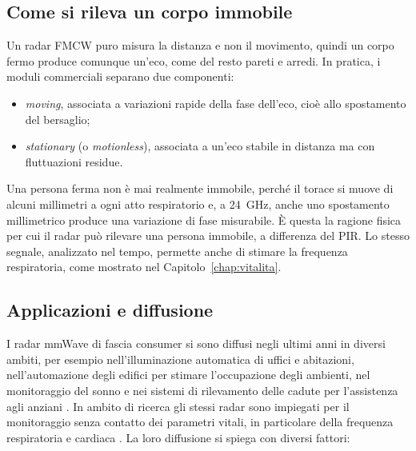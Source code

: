 \FloatBarrier
\subsection{Come si rileva un corpo immobile}
\label{subsec:corpo-immobile}

Un radar FMCW puro misura la distanza e non il movimento, quindi un corpo fermo produce comunque un'eco, come del resto pareti e arredi. In pratica, i moduli commerciali separano due componenti:

\begin{itemize}
    \item \textit{moving}, associata a variazioni rapide della fase dell'eco, cioè allo spostamento del bersaglio;

    \item \textit{stationary} (o \textit{motionless}), associata a un'eco stabile in distanza ma con fluttuazioni residue.
\end{itemize}

Una persona ferma non è mai realmente immobile, perché il torace si muove di alcuni millimetri a ogni atto respiratorio e, a 24~GHz, anche uno spostamento millimetrico produce una variazione di fase misurabile. È questa la ragione fisica per cui il radar può rilevare una persona immobile, a differenza del PIR. Lo stesso segnale, analizzato nel tempo, permette anche di stimare la frequenza respiratoria, come mostrato nel Capitolo~\ref{chap:vitalita}.

\subsection{Applicazioni e diffusione}
\label{subsec:mmwave-usi}

I radar mmWave di fascia consumer si sono diffusi negli ultimi anni in diversi ambiti, per esempio nell'illuminazione automatica di uffici e abitazioni, nell'automazione degli edifici per stimare l'occupazione degli ambienti, nel monitoraggio del sonno e nei sistemi di rilevamento delle cadute per l'assistenza agli anziani \cite{mmwaveOccupancy}. In ambito di ricerca gli stessi radar sono impiegati per il monitoraggio senza contatto dei parametri vitali, in particolare della frequenza respiratoria e cardiaca \cite{upm2024vitals,uts2024vitals,mdpi2024mmwaverm}. La loro diffusione si spiega con diversi fattori:

